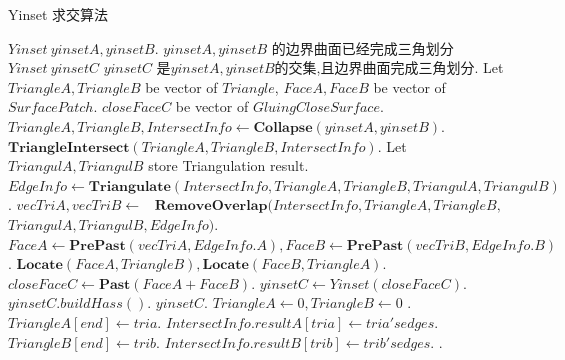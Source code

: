 \documentclass[a4paper]{book}
\renewcommand{\algorithmicrequire}{\textbf{输入:}}
\renewcommand{\algorithmicensure}{\textbf{输出:}}
\renewcommand{\algorithmicrequire}{\textbf{Input : }}
\renewcommand{\algorithmicrequire}{\textbf{Precondition : }}
\renewcommand{\algorithmicensure}{\textbf{Output : }}
\renewcommand{\algorithmicensure}{\textbf{Postcondition : }}
\numberwithin{equation}{chapter}
\theoremstyle{definition}
\begin{document}
\begin{algorithm}  
	\caption{Yinset 求交算法}  
	\label{alg:1}
	\begin{algorithmic}[1] %
		\renewcommand{\algorithmicrequire}{\textbf{Input : }}
		\Require $Yinset\ yinsetA,yinsetB$.
		\renewcommand{\algorithmicrequire}{\textbf{Precondition : }}
		\Require $yinsetA,yinsetB$ 的边界曲面已经完成三角划分
		\renewcommand{\algorithmicensure}{\textbf{Output : }}
		\Ensure $Yinset\ yinsetC$
		\renewcommand{\algorithmicensure}{\textbf{Postcondition : }}
		\Ensure $yinsetC$ 是$yinsetA,yinsetB$的交集,且边界曲面完成三角划分.
		\State Let $TriangleA,TriangleB$ be vector of $Triangle$, 
		\State $FaceA,FaceB$ be vector of $SurfacePatch$.
		$closeFaceC$ be vector of $GluingCloseSurface$.
		\State $TriangleA,TriangleB,IntersectInfo \gets \textbf{Collapse}(yinsetA,yinsetB)$. 
		\State $\textbf{TriangleIntersect}(TriangleA,TriangleB,IntersectInfo)$.
		\State Let $TriangulA,TriangulB$ store Triangulation  result.
		\State $EdgeInfo \gets \textbf{Triangulate}(IntersectInfo,TriangleA,TriangleB,TriangulA,TriangulB)$.
		\State $vecTriA,vecTriB  \gets $
		\Statex \quad \  $\textbf{RemoveOverlap}(IntersectInfo,TriangleA,TriangleB,$
		$TriangulA,TriangulB,EdgeInfo)$.
		\State $FaceA \gets \textbf{PrePast}(vecTriA,EdgeInfo.A), 
		FaceB \gets \textbf{PrePast}(vecTriB,EdgeInfo.B)$.
		\State $\textbf{Locate}(FaceA,TriangleB),\textbf{Locate}(FaceB,TriangleA)$.
		\State $closeFaceC \gets \textbf{Past}(FaceA + FaceB)$.
		\State $yinsetC \gets Yinset(closeFaceC)$. 
		\State $yinsetC.buildHass()$.
		\State \Return $yinsetC$. 
		\EndFunction
		\State
		\State $TriangleA \gets 0, TriangleB \gets 0$ . 
		\State $TriangleA[end] \gets tria $.
		\State $IntersectInfo.resultA[tria] \gets tria's edges$.
		\State $TriangleB[end] \gets trib$.
		\State $IntersectInfo.resultB[trib] \gets trib's edges$.
		\EndFor
		\EndFor
		\State {}.
		\EndFunction
	\end{algorithmic}
\end{algorithm}
\end{document}
